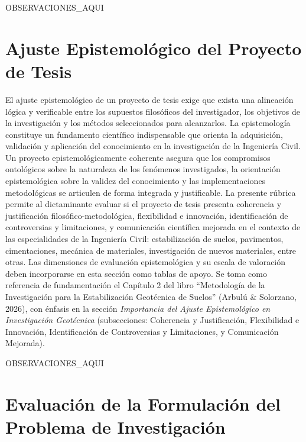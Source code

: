 \documentclass[12pt,a4paper]{report}
\begin{document}
{{OBSERVACIONES_AQUI}}


\section{Ajuste Epistemológico del Proyecto de Tesis}

El ajuste epistemológico de un proyecto de tesis exige que exista una alineación lógica y verificable entre los supuestos filosóficos del investigador, los objetivos de la investigación y los métodos seleccionados para alcanzarlos. La epistemología constituye un fundamento científico indispensable que orienta la adquisición, validación y aplicación del conocimiento en la investigación de la Ingeniería Civil. Un proyecto epistemológicamente coherente asegura que los compromisos ontológicos sobre la naturaleza de los fenómenos investigados, la orientación epistemológica sobre la validez del conocimiento y las implementaciones metodológicas se articulen de forma integrada y justificable. La presente rúbrica permite al dictaminante evaluar si el proyecto de tesis presenta coherencia y justificación filosófico-metodológica, flexibilidad e innovación, identificación de controversias y limitaciones, y comunicación científica mejorada en el contexto de las especialidades de la Ingeniería Civil: estabilización de suelos, pavimentos, cimentaciones, mecánica de materiales, investigación de nuevos materiales, entre otras. Las dimensiones de evaluación epistemológica y su escala de valoración deben incorporarse en esta sección como tablas de apoyo. Se toma como referencia de fundamentación el Capítulo 2 del libro \enquote{Metodología de la Investigación para la Estabilización Geotécnica de Suelos} (Arbulú \& Solorzano, 2026), con énfasis en la sección \textit{Importancia del Ajuste Epistemológico en Investigación Geotécnica} (subsecciones: Coherencia y Justificación, Flexibilidad e Innovación, Identificación de Controversias y Limitaciones, y Comunicación Mejorada). 


{{OBSERVACIONES_AQUI}}


\section{Evaluación de la Formulación del Problema de Investigación}
\end{document}
